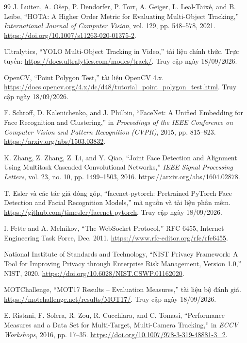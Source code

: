 \begin{thebibliography}{99}
 J. Luiten, A. Ošep, P. Dendorfer, P. Torr, A. Geiger, L. Leal-Taixé, and B. Leibe, ``HOTA: A Higher Order Metric for Evaluating Multi-Object Tracking,'' \textit{International Journal of Computer Vision}, vol. 129, pp. 548--578, 2021. \url{https://doi.org/10.1007/s11263-020-01375-2}.

 Ultralytics, ``YOLO Multi-Object Tracking in Video,'' tài liệu chính thức. Trực tuyến: \url{https://docs.ultralytics.com/modes/track/}. Truy cập ngày 18/09/2026.

 OpenCV, ``Point Polygon Test,'' tài liệu OpenCV 4.x. \url{https://docs.opencv.org/4.x/dc/d48/tutorial_point_polygon_test.html}. Truy cập ngày 18/09/2026.

 F. Schroff, D. Kalenichenko, and J. Philbin, ``FaceNet: A Unified Embedding for Face Recognition and Clustering,'' in \textit{Proceedings of the IEEE Conference on Computer Vision and Pattern Recognition (CVPR)}, 2015, pp. 815--823. \url{https://arxiv.org/abs/1503.03832}.

 K. Zhang, Z. Zhang, Z. Li, and Y. Qiao, ``Joint Face Detection and Alignment Using Multitask Cascaded Convolutional Networks,'' \textit{IEEE Signal Processing Letters}, vol. 23, no. 10, pp. 1499--1503, 2016. \url{https://arxiv.org/abs/1604.02878}.

 T. Esler và các tác giả đóng góp, ``facenet-pytorch: Pretrained PyTorch Face Detection and Facial Recognition Models,'' mã nguồn và tài liệu phần mềm. \url{https://github.com/timesler/facenet-pytorch}. Truy cập ngày 18/09/2026.

 I. Fette and A. Melnikov, ``The WebSocket Protocol,'' RFC 6455, Internet Engineering Task Force, Dec. 2011. \url{https://www.rfc-editor.org/rfc/rfc6455}.

 National Institute of Standards and Technology, ``NIST Privacy Framework: A Tool for Improving Privacy through Enterprise Risk Management, Version 1.0,'' NIST, 2020. \url{https://doi.org/10.6028/NIST.CSWP.01162020}.

 MOTChallenge, ``MOT17 Results -- Evaluation Measures,'' tài liệu bộ đánh giá. \url{https://motchallenge.net/results/MOT17/}. Truy cập ngày 18/09/2026.

 E. Ristani, F. Solera, R. Zou, R. Cucchiara, and C. Tomasi, ``Performance Measures and a Data Set for Multi-Target, Multi-Camera Tracking,'' in \textit{ECCV Workshops}, 2016, pp. 17--35. \url{https://doi.org/10.1007/978-3-319-48881-3_2}.


\end{thebibliography}
